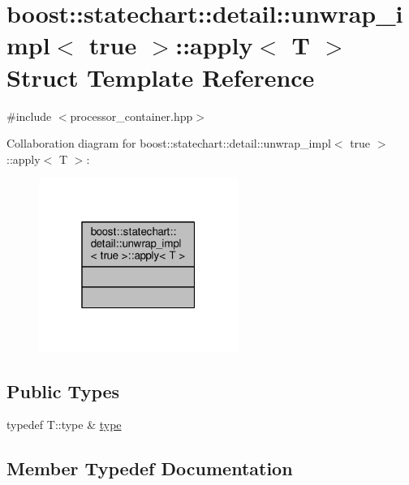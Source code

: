 \hypertarget{structboost_1_1statechart_1_1detail_1_1unwrap__impl_3_01true_01_4_1_1apply}{}\section{boost\+:\+:statechart\+:\+:detail\+:\+:unwrap\+\_\+impl$<$ true $>$\+:\+:apply$<$ T $>$ Struct Template Reference}
\label{structboost_1_1statechart_1_1detail_1_1unwrap__impl_3_01true_01_4_1_1apply}


{\ttfamily \#include $<$processor\+\_\+container.\+hpp$>$}



Collaboration diagram for boost\+:\+:statechart\+:\+:detail\+:\+:unwrap\+\_\+impl$<$ true $>$\+:\+:apply$<$ T $>$\+:
\nopagebreak
\begin{figure}[H]
\begin{center}
\leavevmode
\includegraphics[width=184pt]{structboost_1_1statechart_1_1detail_1_1unwrap__impl_3_01true_01_4_1_1apply__coll__graph}
\end{center}
\end{figure}
\subsection*{Public Types}
\begin{DoxyCompactItemize}
\item 
typedef T\+::type \& \mbox{\hyperlink{structboost_1_1statechart_1_1detail_1_1unwrap__impl_3_01true_01_4_1_1apply_a780f1b70daae566b269900bd6aa0126c}{type}}
\end{DoxyCompactItemize}


\subsection{Member Typedef Documentation}
\mbox{\label{structboost_1_1statechart_1_1detail_1_1unwrap__impl_3_01true_01_4_1_1apply_a780f1b70daae566b269900bd6aa0126c}} 
